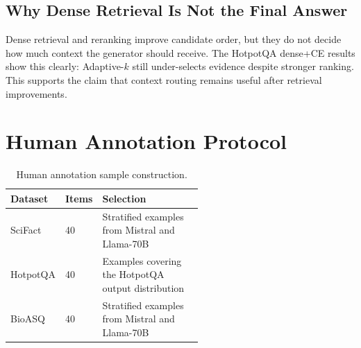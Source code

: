 \documentclass[11pt]{article}
\begin{document}
\subsection{Why Dense Retrieval Is Not the Final Answer}

Dense retrieval and reranking improve candidate order, but they do not decide how much context the generator should receive. The HotpotQA dense+CE results show this clearly: Adaptive-$k$ still under-selects evidence despite stronger ranking. This supports the claim that context routing remains useful after retrieval improvements.

\section{Human Annotation Protocol}
\label{app:annotation-protocol}

\begin{table}[H]
\centering
\small
\caption{Human annotation label definitions.}
\label{tab:annotation_labels}
\end{table}

\begin{table}[H]
\centering
\small
\caption{Human annotation sample construction.}
\label{tab:annotation_sample}
\begin{tabular}{llp{0.55\linewidth}}
\toprule
Dataset & Items & Selection \\
\midrule
SciFact & 40 & Stratified examples from Mistral and Llama-70B \\
HotpotQA & 40 & Examples covering the HotpotQA output distribution \\
BioASQ & 40 & Stratified examples from Mistral and Llama-70B \\
\bottomrule
\end{tabular}
\end{table}
\end{document}
